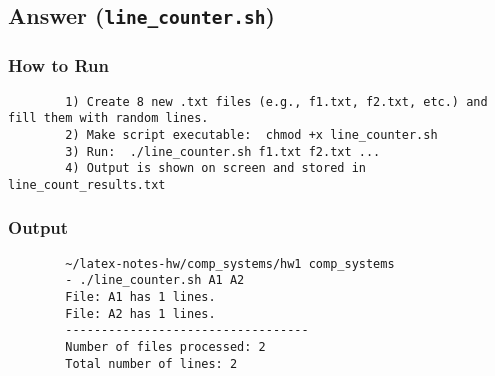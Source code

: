 \documentclass[12pt]{article}
\begin{document}
	\subsection*{Answer (\texttt{line\_counter.sh})}
	
	
	\subsubsection*{How to Run}
	\begin{verbatim}
		1) Create 8 new .txt files (e.g., f1.txt, f2.txt, etc.) and fill them with random lines.
		2) Make script executable:  chmod +x line_counter.sh
		3) Run:  ./line_counter.sh f1.txt f2.txt ...
		4) Output is shown on screen and stored in line_count_results.txt
	\end{verbatim}
	
	\subsubsection*{Output}
	\begin{verbatim}
		~/latex-notes-hw/comp_systems/hw1 comp_systems
		- ./line_counter.sh A1 A2
		File: A1 has 1 lines.
		File: A2 has 1 lines.
		----------------------------------
		Number of files processed: 2
		Total number of lines: 2
	\end{verbatim}
	
\end{document}
